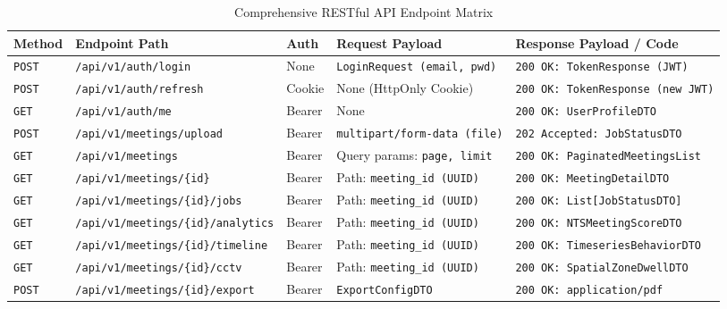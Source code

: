 \documentclass[12pt,a4paper,oneside]{report}
\begin{document}
\begin{table}[htbp]
\centering
\caption{Comprehensive RESTful API Endpoint Matrix}
\label{tab:appendix_api}
\fontsize{8.5}{10.5}\selectfont
\begin{tabularx}{\textwidth}{@{}l l p{1.5cm} p{3.0cm} X@{}}
\toprule
\textbf{Method} & \textbf{Endpoint Path} & \textbf{Auth} & \textbf{Request Payload} & \textbf{Response Payload / Code} \\
\midrule
\texttt{POST} & \texttt{/api/v1/auth/login} & None & \texttt{LoginRequest (email, pwd)} & \texttt{200 OK: TokenResponse (JWT)} \\
\addlinespace
\texttt{POST} & \texttt{/api/v1/auth/refresh} & Cookie & None (HttpOnly Cookie) & \texttt{200 OK: TokenResponse (new JWT)} \\
\addlinespace
\texttt{GET}  & \texttt{/api/v1/auth/me} & Bearer & None & \texttt{200 OK: UserProfileDTO} \\
\addlinespace
\texttt{POST} & \texttt{/api/v1/meetings/upload} & Bearer & \texttt{multipart/form-data (file)} & \texttt{202 Accepted: JobStatusDTO} \\
\addlinespace
\texttt{GET}  & \texttt{/api/v1/meetings} & Bearer & Query params: \texttt{page, limit} & \texttt{200 OK: PaginatedMeetingsList} \\
\addlinespace
\texttt{GET}  & \texttt{/api/v1/meetings/\{id\}} & Bearer & Path: \texttt{meeting\_id (UUID)} & \texttt{200 OK: MeetingDetailDTO} \\
\addlinespace
\texttt{GET}  & \texttt{/api/v1/meetings/\{id\}/jobs} & Bearer & Path: \texttt{meeting\_id (UUID)} & \texttt{200 OK: List[JobStatusDTO]} \\
\addlinespace
\texttt{GET}  & \texttt{/api/v1/meetings/\{id\}/analytics} & Bearer & Path: \texttt{meeting\_id (UUID)} & \texttt{200 OK: NTSMeetingScoreDTO} \\
\addlinespace
\texttt{GET}  & \texttt{/api/v1/meetings/\{id\}/timeline} & Bearer & Path: \texttt{meeting\_id (UUID)} & \texttt{200 OK: TimeseriesBehaviorDTO} \\
\addlinespace
\texttt{GET}  & \texttt{/api/v1/meetings/\{id\}/cctv} & Bearer & Path: \texttt{meeting\_id (UUID)} & \texttt{200 OK: SpatialZoneDwellDTO} \\
\addlinespace
\texttt{POST} & \texttt{/api/v1/meetings/\{id\}/export} & Bearer & \texttt{ExportConfigDTO} & \texttt{200 OK: application/pdf} \\
\bottomrule
\end{tabularx}
\end{table}
\end{document}
